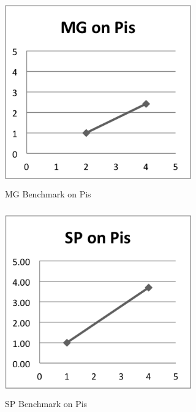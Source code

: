 \documentclass{acm_proc_article-sp}
\begin{document}
\begin{figure}[tbp]
  \centering
  \caption{MG Benchmark on Pis}
	\label{PiMG}
  \includegraphics[width=19pc, height=19pc]{Pics-Pi/MG.png}
\end{figure}

\begin{figure}[tbp]
  \centering
  \caption{SP Benchmark on Pis}
	\label{PiSP}
  \includegraphics[width=19pc, height=19pc]{Pics-Pi/SP.png}
\end{figure}






%

\end{document}
